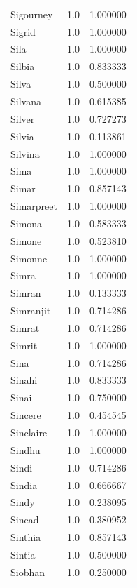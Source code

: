\documentclass[
  letterpaper,
  DIV=11,
  numbers=noendperiod]{scrreprt}
\begin{document}
\begin{tabular}{lrr}
Sigourney       &   1.0 &   1.000000 \\
Sigrid          &   1.0 &   1.000000 \\
Sila            &   1.0 &   1.000000 \\
Silbia          &   1.0 &   0.833333 \\
Silva           &   1.0 &   0.500000 \\
Silvana         &   1.0 &   0.615385 \\
Silver          &   1.0 &   0.727273 \\
Silvia          &   1.0 &   0.113861 \\
Silvina         &   1.0 &   1.000000 \\
Sima            &   1.0 &   1.000000 \\
Simar           &   1.0 &   0.857143 \\
Simarpreet      &   1.0 &   1.000000 \\
Simona          &   1.0 &   0.583333 \\
Simone          &   1.0 &   0.523810 \\
Simonne         &   1.0 &   1.000000 \\
Simra           &   1.0 &   1.000000 \\
Simran          &   1.0 &   0.133333 \\
Simranjit       &   1.0 &   0.714286 \\
Simrat          &   1.0 &   0.714286 \\
Simrit          &   1.0 &   1.000000 \\
Sina            &   1.0 &   0.714286 \\
Sinahi          &   1.0 &   0.833333 \\
Sinai           &   1.0 &   0.750000 \\
Sincere         &   1.0 &   0.454545 \\
Sinclaire       &   1.0 &   1.000000 \\
Sindhu          &   1.0 &   1.000000 \\
Sindi           &   1.0 &   0.714286 \\
Sindia          &   1.0 &   0.666667 \\
Sindy           &   1.0 &   0.238095 \\
Sinead          &   1.0 &   0.380952 \\
Sinthia         &   1.0 &   0.857143 \\
Sintia          &   1.0 &   0.500000 \\
Siobhan         &   1.0 &   0.250000 \\

\end{tabular}
\end{document}

